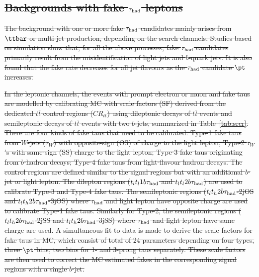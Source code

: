 \documentclass[PAPER, coverpage, atlasdraft=true, texlive=2016, UKenglish]{\ATLASLATEXPATH atlasdoc}
\providecommand{\DIFdel}[1]{{\protect\color{red}\sout{#1}}}                      %
\begin{document}
\subsection{\DIFdel{Backgrounds with fake $\tau_{\mathrm{had}}$ leptons}}
\addtocounter{subsection}{-1}%
\DIFdel{The background with one or more fake $\tau_{\mathrm{had}}$ candidates mainly arises from $\ttbar$ or
multi-jet production, depending on the search channels.
Studies based on simulation show that, for all the above processes, fake $\tau_{\mathrm{had}}$ candidates primarily result from the
misidentification of light jets and $b$-quark jets.
It is also found that the fake rate decreases for all jet flavours as the $\tau_{\mathrm{had}}$ candidate $\pt$ increases.
}%

\DIFdel{In the leptonic channels, the events with prompt electron or muon and fake taus are modelled by calibrating MC with scale factors (SF)
derived from the dedicated $t\bar t$
control regions ($CR_{tt}$) using dileptonic decays of $t\bar t$ events and semileptonic decays of $t\bar t$ events with two
$b$-jets, summarized in Table~\ref{tab:srcr}. 	
There are four kinds of fake taus that need to be calibrated: Type-1 fake taus from $W$-jets ($\tau_{W}$)
with opposite-sign (OS) of charge to the light lepton;
Type-2 $\tau_{W}$'s with same-sign (SS) charge to the light lepton; Type-3 fake taus originating from $b$-hadron decays; Type-4 fake taus from light-flavour hadron decays.
The control regions are defined similar to the signal regions but with an additional $b$-jet or light lepton.
The dilepton regions ($t_lt_l1b\tau_\text{had}$ and $t_lt_l2b\tau_\text{had}$) are used to calibrate Type-3 and Type-4 fake taus. The semileptonic
regions ($t_lt_h2b\tau_\text{had}$-2jOS and $t_lt_h2b\tau_\text{had}$-3jOS) where $\tau_\text{had}$ and light lepton have opposite charge are used to calibrate Type-1 fake taus.
Similarly for Type-2, the semileptonic regions ($t_lt_h2b\tau_\text{had}$-2jSS and $t_lt_h2b\tau_\text{had}$-3jSS) where $\tau_\text{had}$ and light lepton have same charge are used.
A simultaneous fit to data is made to derive the scale factors for fake taus in MC, which consist of total of 24 parameters
depending on four types, three $\pt$ bins, two bins for 1- and 3-prong taus separately.
These scale factors are then used to correct the MC estimated fakes in the corresponding  signal regions with a single $b$-jet.
}
\end{document}

